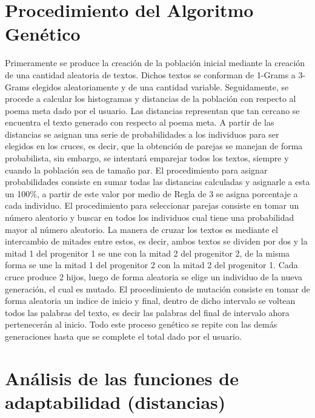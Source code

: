 \documentclass[journal]{IEEEtran}
\begin{document}
\section{Procedimiento del Algoritmo Genético}
	Primeramente se produce la creación de la población inicial mediante la creación de una cantidad aleatoria de textos. Dichos textos se conforman de 1-Grams a 3-Grams elegidos aleatoriamente y de una cantidad variable. Seguidamente, se procede a calcular los histogramas y distancias de la población con respecto al poema meta dado por el usuario. Las distancias representan que tan cercano se encuentra el texto generado con respecto al poema meta. A partir de las distancias se asignan una serie de probabilidades a los individuos para ser elegidos en los cruces, es decir, que la obtención de parejas se manejan de forma probabilista, sin embargo, se intentará emparejar todos los textos, siempre y cuando la población sea de tamaño par. El procedimiento para asignar probabilidades consiste en sumar todas las distancias calculadas y asignarle a esta un 100\%, a partir de este valor por medio de Regla de 3 se asigna porcentaje a cada individuo. El procedimiento para seleccionar parejas consiste en tomar un número aleatorio y buscar en todos los individuos cual tiene una probabilidad mayor al número aleatorio. La manera de cruzar los textos es mediante el intercambio de mitades entre estos, es decir, ambos textos se dividen por dos y la mitad 1 del progenitor 1 se une con la mitad 2 del progenitor 2, de la misma forma se une la mitad 1 del progenitor 2 con la mitad 2 del progenitor 1. Cada cruce produce 2 hijos, luego de forma aleatoria se elige un individuo de la nueva generación, el cual es mutado. El procedimiento de mutación consiste en tomar de forma aleatoria un indice de inicio y final, dentro de dicho intervalo se voltean todos las palabras del texto, es decir las palabras del final de intervalo ahora pertenecerán al inicio. Todo este proceso genético se repite con las demás generaciones hasta que se complete el total dado por el usuario.

\newpage
\section{Análisis de las funciones de adaptabilidad (distancias)}
\end{document}
